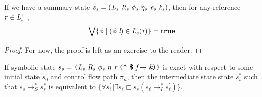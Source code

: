 \begin{theorem}
\label{thm:colex}
If we have a summary state $s_s = ( \cfgnt{L}_s\ \cfgnt{R}_s\ \phi_s\ \eta_s\ \cfgnt{e}_s\ \cfgnt{k}_s )$, then for any reference $r \in \emph{L}_s^\leftarrow$, 
$$\bigvee \{ \phi \mid (\phi\ \emph{l})\in \emph{L}_s (\emph{r})\} = \textbf{true}$$
\end{theorem}
\begin{proof}
For now, the proof is left as an exercise to the reader.
\end{proof}
%

\begin{lemma}
\label{lem:init}
If symbolic state $s_s = \lp \cfgnt{L}_s\ \cfgnt{R}_{s}\ \phi_s\ \eta\ \cfgnt{r}\ \lp \cfgt{*}\ \cfgt{\$}\ \cfgnt{f} \rightarrow \cfgnt{k}\rp \rp$ is exact with respect to some initial state $s_0$ and control flow path $\pi_n$, then the intermediate state state $s_s^*$ such that $s_s \rightarrow_S^* s_s^*$ is equivalent to $\{\forall s_\ell^\prime | \exists s_\ell \sqsubset s_s (s_\ell \rightarrow_I^* s_\ell^\prime)  \}$.
\end{lemma}

